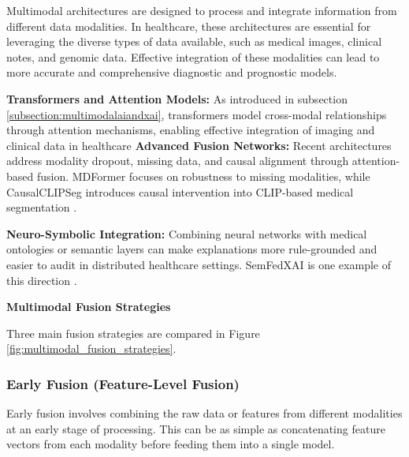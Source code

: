 \documentclass[pdflatex,sn-mathphys-num]{sn-jnl}%
\theoremstyle{thmstyleone}%
\theoremstyle{thmstyletwo}%
\theoremstyle{thmstylethree}%
\begin{document}
\begin{itemize}
Multimodal architectures are designed to process and integrate information from different data modalities. In healthcare, these architectures are essential for leveraging the diverse types of data available, such as medical images, clinical notes, and genomic data. Effective integration of these modalities can lead to more accurate and comprehensive diagnostic and prognostic models.


\textbf{Transformers and Attention Models:} 
    As introduced in subsection \ref{subsection:multimodalaiandxai}, transformers model cross-modal relationships through attention mechanisms, enabling effective integration of imaging and clinical data in healthcare \cite{rodis2024multimodalexplainableartificialintelligence, HOFMANN2022119504}
\textbf{Advanced Fusion Networks:} Recent architectures address modality dropout, missing data, and causal alignment through attention-based fusion. MDFormer focuses on robustness to missing modalities, while CausalCLIPSeg introduces causal intervention into CLIP-based medical segmentation \cite{li2025mdformer,chen2025causalclipsegunlockingclipspotential}.

\textbf{Neuro-Symbolic Integration:} Combining neural networks with medical ontologies or semantic layers can make explanations more rule-grounded and easier to audit in distributed healthcare settings. SemFedXAI is one example of this direction \cite{info16060435}.
    
    \textbf{Multimodal Fusion Strategies }

    Three main fusion strategies are compared in Figure \ref{fig:multimodal_fusion_strategies}.
\subsubsection{Early Fusion (Feature-Level Fusion)}
Early fusion involves combining the raw data or features from different modalities at an early stage of processing. This can be as simple as concatenating feature vectors from each modality before feeding them into a single model.
        

\end{itemize}
\end{document}
